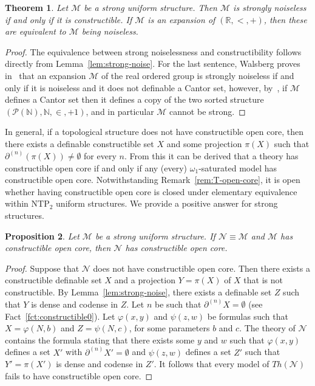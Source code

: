 \documentclass[12pt]{article}
\newcommand{\Mm}{\mathcal{M}}
\newcommand{\Nn}{\mathcal{N}}
\newcommand{\R}{\mathbb{R}}
\newcommand{\N}{\mathbb{N}}
\newcommand{\NTP}{\ensuremath{\mathrm{NTP}_2}}
\newcommand{\partn}[1]{\partial^{(#1)}}
\newtheorem{theorem}{Theorem}[section] %
\newtheorem{proposition}[theorem]{Proposition}
\theoremstyle{definition}
\theoremstyle{remark}
\begin{document}

\begin{theorem}\label{thm:strong-noise}
Let $\Mm$ be a strong uniform structure. Then $\Mm$ is strongly noiseless if and only if it is constructible. If $\Mm$ is an expansion of $(\R,<,+)$, then these are equivalent to $\Mm$ being noiseless.  
\end{theorem}
\begin{proof}
The equivalence between strong noiselessness and constructibility follows directly from Lemma~\ref{lem:strong-noise}. For the last sentence, Walsberg proves in~\cite[Theorem 8.1]{Wal22} that an expansion $\Mm$ of the real ordered group is strongly noiseless if and only if it is noiseless and it does not definable a Cantor set, however, by~\cite[Theorem B]{HW18}, if $\Mm$ defines a Cantor set then it defines a copy of the two sorted structure $(\mathcal{P}(\N), \N,\in, +1)$, and in particular $\Mm$ cannot be strong. 
\end{proof}
 
In general, if a topological structure does not have constructible open core, then there exists a definable constructible set $X$ and some projection $\pi(X)$ such that $\partn{n}(\pi(X)) \neq \emptyset$ for every $n$. From this it can be derived that a theory has constructible open core if and only if any (every) $\omega_1$-saturated model has constructible open core. Notwithstanding Remark~\ref{rem:T-open-core}, it is open whether having constructible open core is closed under elementary equivalence within $\NTP$ uniform structures. We provide a positive answer for strong structures. 

\begin{proposition}\label{prop:cons-OC}
Let $\Mm$ be a strong uniform structure. If $\Nn\equiv \Mm$ and $\Mm$ has constructible open core, then $\Nn$ has constructible open core. 
\end{proposition}
\begin{proof}
Suppose that $\Nn$ does not have constructible open core. Then there exists a constructible definable set $X$ and a projection $Y=\pi(X)$ of $X$ that is not constructible. By Lemma~\ref{lem:strong-noise}, there exists a definable set $Z$ such that $Y$ is dense and codense in $Z$. Let $n$ be such that $\partn{n}X =\emptyset$ (see Fact~\ref{fct:constructible0}). Let $\varphi(x,y)$ and $\psi(z,w)$ be formulas such that $X=\varphi(N,b)$ and $Z=\psi(N,c)$, for some parameters $b$ and $c$. The theory of $\Nn$ contains the formula stating that there exists some $y$ and $w$ such that $\varphi(x,y)$ defines a set $X'$ with $\partn{n}X'=\emptyset$ and $\psi(z,w)$ defines a set $Z'$ such that $Y'=\pi(X')$ is dense and codense in $Z'$. It follows that every model of $Th(\Nn)$ fails to have constructible open core.   
\end{proof}
\end{document}

